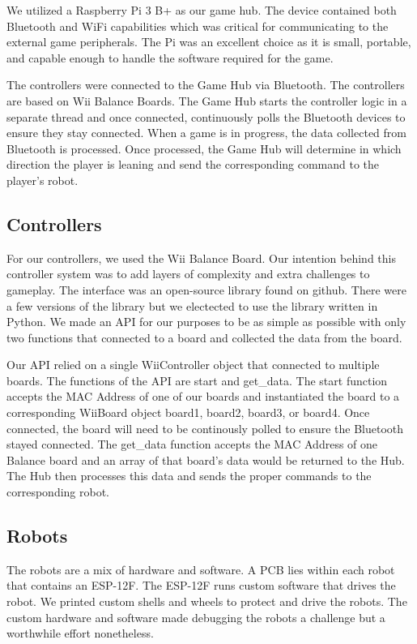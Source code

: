 \documentclass[11pt]{ieeeconf}
\begin{document}
We utilized a Raspberry Pi 3 B+ as our game hub. The device contained both Bluetooth and WiFi capabilities which was critical for communicating to the external game peripherals. The Pi was an excellent choice as it is small, portable, and capable enough to handle the software required for the game. 

The controllers were connected to the Game Hub via Bluetooth. The controllers are based on Wii Balance Boards. The Game Hub starts the controller logic in a separate thread and once connected, continuously polls the Bluetooth devices to ensure they stay connected. When a game is in progress, the data collected from Bluetooth is processed. Once processed, the Game Hub will determine in which direction the player is leaning and send the corresponding command to the player's robot.

\subsection{Controllers}
For our controllers, we used the Wii Balance Board. Our intention behind this controller system was to add layers of complexity and extra challenges to gameplay. The interface was an open-source library found on github. There were a few versions of the library but we electected to use the library written in Python. We made an API for our purposes to be as simple as possible with only two functions that connected to a board and collected the data from the board.

Our API relied on a single WiiController object that connected to multiple boards. The functions of the API are start and get\_data. The start function accepts the MAC Address of one of our boards and instantiated the board to a corresponding WiiBoard object board1, board2, board3, or board4. Once connected, the board will need to be continously polled to ensure the Bluetooth stayed connected. The get\_data function accepts the MAC Address of one Balance board and an array of that board's data would be returned to the Hub. The Hub then processes this data and sends the proper commands to the corresponding robot.

\subsection{Robots}

The robots are a mix of hardware and software. A PCB lies within each robot that contains an ESP-12F. The ESP-12F runs custom software that drives the robot. We printed custom shells and wheels to protect and drive the robots. The custom hardware and software made debugging the robots a challenge but a worthwhile effort nonetheless. 
\end{document}
